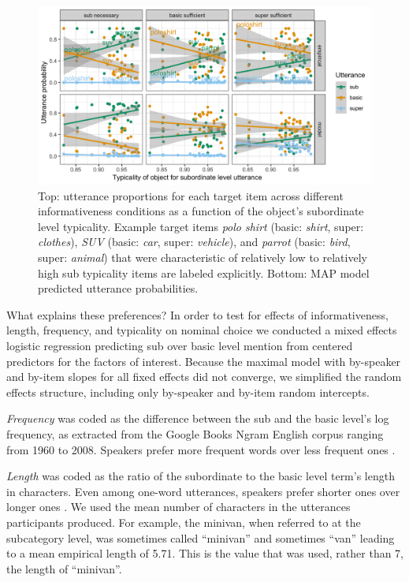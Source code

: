 \documentclass[11pt]{article}
\begin{document}
\begin{figure}
\centering
\includegraphics[width=\textwidth]{pics/results-exp3.png}
\caption{Top: utterance proportions for each target item across different informativeness conditions as a function of the object's subordinate level typicality. Example target items \emph{polo shirt} (basic: \emph{shirt}, super: \emph{clothes}),  \emph{SUV} (basic: \emph{car}, super: \emph{vehicle}), and \emph{parrot} (basic: \emph{bird}, super: \emph{animal}) that were characteristic of relatively low to relatively high sub typicality items are labeled explicitly. Bottom: MAP model predicted utterance probabilities.}
\label{fig:exp3results}
\end{figure}

What explains these preferences? In order to test for effects of informativeness, length, frequency, and typicality on nominal choice we conducted a mixed effects logistic regression predicting sub over basic level mention from centered predictors for the factors of interest. Because the maximal model with by-speaker and by-item slopes for all fixed effects did not converge, we simplified the random effects structure, including only by-speaker and by-item random intercepts.

\emph{Frequency} was coded as the difference between the sub and the basic level's log frequency, as extracted from the Google Books Ngram English corpus ranging from 1960 to 2008. Speakers prefer more frequent words over less frequent ones \cite{oldfield1965response}.

\emph{Length} was coded as the ratio of the subordinate to the basic level term's length in characters. Even among one-word utterances, speakers prefer shorter ones over longer ones \cite{degenfrankejaeger2013, rohde2012}. We used the mean number of characters in the utterances participants produced. For example, the minivan, when referred to at the subcategory level, was sometimes called ``minivan'' and sometimes ``van'' leading to a mean empirical length of 5.71. This is the value that was used, rather than 7, the length of ``minivan''. %
\end{document}

